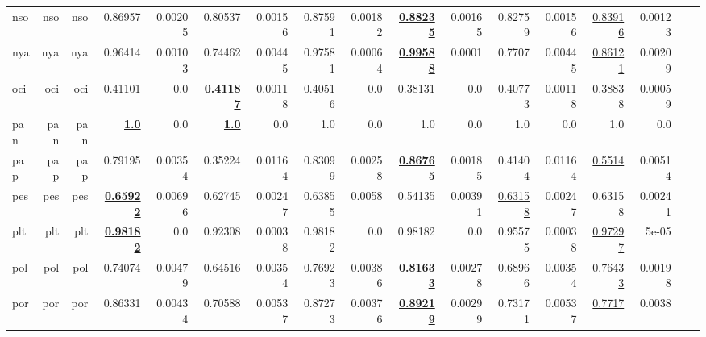 \documentclass[11pt]{article}
\begin{document}
\begin{table*}[h]
{\begin{tabular}{lrrrrrrrrrrrrrrrr}
nso         & nso         & nso         & 0.86957         & 0.00205         & 0.80537         & 0.00156         & 0.87591         & 0.00182         & \textbf{\underline{0.88235}}         & 0.00165         & 0.82759         & 0.00156         & \underline{0.83916}         & 0.00123         \\
nya         & nya         & nya         & 0.96414         & 0.00103         & 0.74462         & 0.00445         & 0.97581         & 0.00064         & \textbf{\underline{0.99588}}         & 0.0001         & 0.7707         & 0.00445         & \underline{0.86121}         & 0.00209         \\
oci         & oci         & oci         & \underline{0.41101}         & 0.0         & \textbf{\underline{0.41187}}         & 0.00118         & 0.40516         & 0.0         & 0.38131         & 0.0         & 0.40773         & 0.00118         & 0.38838         & 0.00059         \\
pan         & pan         & pan         & \textbf{\underline{1.0}}         & 0.0         & \textbf{\underline{1.0}}         & 0.0         & 1.0         & 0.0         & 1.0         & 0.0         & 1.0         & 0.0         & 1.0         & 0.0         \\
pap         & pap         & pap         & 0.79195         & 0.00354         & 0.35224         & 0.01164         & 0.83099         & 0.00258         & \textbf{\underline{0.86765}}         & 0.00185         & 0.41404         & 0.01164         & \underline{0.5514}         & 0.00514         \\
pes         & pes         & pes         & \textbf{\underline{0.65922}}         & 0.00696         & 0.62745         & 0.00247         & 0.63855         & 0.0058         & 0.54135         & 0.00391         & \underline{0.63158}         & 0.00247         & 0.63158         & 0.00241         \\
plt         & plt         & plt         & \textbf{\underline{0.98182}}         & 0.0         & 0.92308         & 0.00038         & 0.98182         & 0.0         & 0.98182         & 0.0         & 0.95575         & 0.00038         & \underline{0.97297}         & 5e-05         \\
pol         & pol         & pol         & 0.74074         & 0.00479         & 0.64516         & 0.00354         & 0.76923         & 0.00386         & \textbf{\underline{0.81633}}         & 0.00278         & 0.68966         & 0.00354         & \underline{0.76433}         & 0.00198         \\
por         & por         & por         & 0.86331         & 0.00434         & 0.70588         & 0.00537         & 0.87273         & 0.00376         & \textbf{\underline{0.89219}}         & 0.00299         & 0.73171         & 0.00537         & \underline{0.7717}         & 0.0038         \\

\end{tabular}}
\end{table*}
\end{document}
